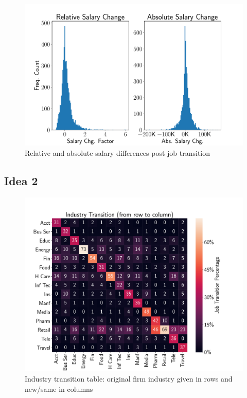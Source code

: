 \documentclass[10pt]{article}
\begin{document}
\begin{figure}[thb]
    \centering
    \includegraphics[width=1.0\linewidth]{salgr.pdf}
	\caption{Relative and absolute salary differences post job transition}
	\label{fig:transmat}
\end{figure}


\subsection{Idea 2}


\begin{figure}[thb]
    \centering
	\includegraphics[width=1.0\linewidth]{transmat.pdf}
	\caption{Industry transition table: original firm 
   industry given in rows and new/same in columns}
	\label{fig:transmat}
\end{figure}
\end{document}

